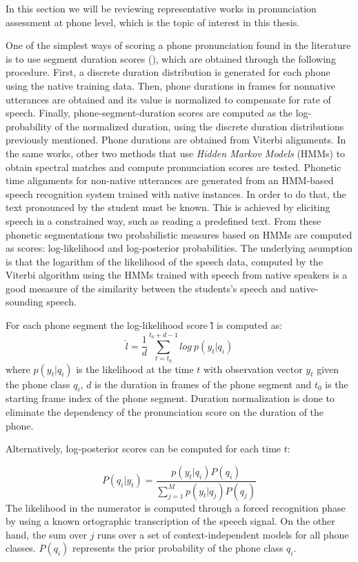 In this section we will be reviewing representative works in pronunciation assessment
at phone level, which is the topic of interest in this thesis.

One of the simplest ways of scoring a phone pronunciation found in the literature 
is to use segment duration scores (\cite{pronunciation_scoring_instruction, pronunciation_scoring_phone_segments_instruction}), which are obtained through the following
procedure. First, a discrete duration distribution is generated for each phone
using the native training data. 
Then, phone durations in frames for nonnative utterances are obtained 
and its value is normalized to compensate for rate of speech. 
Finally, phone-segment-duration scores are computed as 
the log-probability of the normalized duration, using the discrete duration 
distributions previously mentioned. Phone durations are obtained from Viterbi alignments.
In the same works, other two methods that use \textit{Hidden Markov Models} (HMMs) to obtain 
spectral matches and compute pronunciation scores are tested. 
Phonetic time alignments for
non-native utterances are generated from an HMM-based speech recognition system trained
with native instances. In order to do that, the text pronounced by the student 
must be known. This is achieved by eliciting speech in a
constrained way, such as reading a predefined text.
From these phonetic segmentations two 
probabilistic measures based on HMMs are computed as scores: log-likelihood and 
log-posterior probabilities. The underlying asumption is that the logarithm of the likelihood
of the speech data, computed by the Viterbi algorithm using the HMMs trained with speech from native
speakers is a good mesasure of the similarity between the students's
speech and native-sounding speech.

For each phone segment the log-likelihood score \^{l} is computed as:
\begin{equation}
\hat{l} = \frac{1}{d} \sum_{t=t_{0}}^{t_{0}+d-1} log \ p(y_{t}|q_{i})
\end{equation}
where $p(y_{t}|q_{i})$ is the likelihood at the time $t$ with observation vector $y_{t}$
given the phone class $q_{i}$, $d$ is the duration in frames of the phone segment 
and $t_{0}$ is the starting frame index of the phone segment. Duration normalization is done to 
eliminate the dependency of the pronunciation score on the duration of the phone.

Alternatively, log-posterior scores can be computed for each time $t$:

\begin{equation}
P(q_{i}|y_{t}) = \frac{p(y_{t}|q_{i})P(q_{i})}{\sum\limits_{j=1}^{M} p(y_{t}|q_{j})P(q_{j})}
\end{equation}
The likelihood in the numerator is computed through a forced recognition phase by using a known 
ortographic transcription of the speech signal. On the other hand, 
the sum over $j$ runs over a set of context-independent models for all phone classes. $P(q_{i})$
represents the prior probability of the phone class $q_{i}$. 

